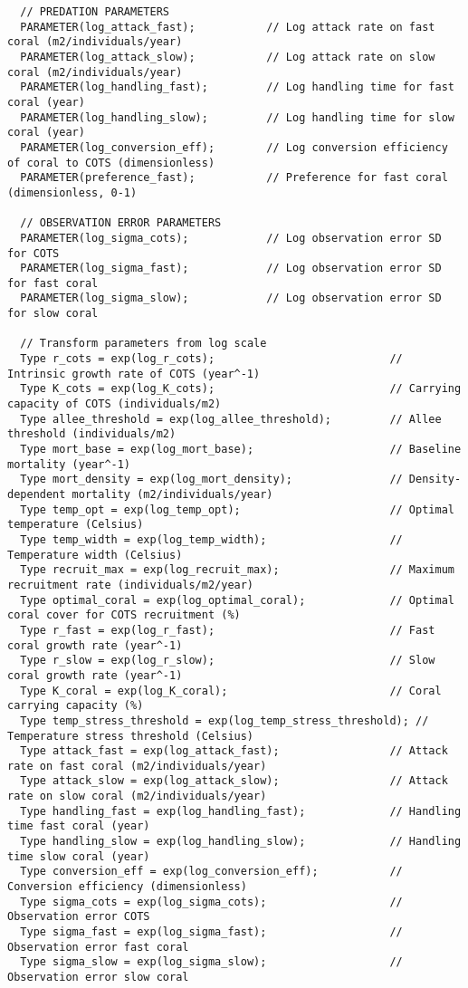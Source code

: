 \begin{lstlisting}
  // PREDATION PARAMETERS
  PARAMETER(log_attack_fast);           // Log attack rate on fast coral (m2/individuals/year)
  PARAMETER(log_attack_slow);           // Log attack rate on slow coral (m2/individuals/year)
  PARAMETER(log_handling_fast);         // Log handling time for fast coral (year)
  PARAMETER(log_handling_slow);         // Log handling time for slow coral (year)
  PARAMETER(log_conversion_eff);        // Log conversion efficiency of coral to COTS (dimensionless)
  PARAMETER(preference_fast);           // Preference for fast coral (dimensionless, 0-1)
  
  // OBSERVATION ERROR PARAMETERS
  PARAMETER(log_sigma_cots);            // Log observation error SD for COTS
  PARAMETER(log_sigma_fast);            // Log observation error SD for fast coral
  PARAMETER(log_sigma_slow);            // Log observation error SD for slow coral
  
  // Transform parameters from log scale
  Type r_cots = exp(log_r_cots);                           // Intrinsic growth rate of COTS (year^-1)
  Type K_cots = exp(log_K_cots);                           // Carrying capacity of COTS (individuals/m2)
  Type allee_threshold = exp(log_allee_threshold);         // Allee threshold (individuals/m2)
  Type mort_base = exp(log_mort_base);                     // Baseline mortality (year^-1)
  Type mort_density = exp(log_mort_density);               // Density-dependent mortality (m2/individuals/year)
  Type temp_opt = exp(log_temp_opt);                       // Optimal temperature (Celsius)
  Type temp_width = exp(log_temp_width);                   // Temperature width (Celsius)
  Type recruit_max = exp(log_recruit_max);                 // Maximum recruitment rate (individuals/m2/year)
  Type optimal_coral = exp(log_optimal_coral);             // Optimal coral cover for COTS recruitment (%)
  Type r_fast = exp(log_r_fast);                           // Fast coral growth rate (year^-1)
  Type r_slow = exp(log_r_slow);                           // Slow coral growth rate (year^-1)
  Type K_coral = exp(log_K_coral);                         // Coral carrying capacity (%)
  Type temp_stress_threshold = exp(log_temp_stress_threshold); // Temperature stress threshold (Celsius)
  Type attack_fast = exp(log_attack_fast);                 // Attack rate on fast coral (m2/individuals/year)
  Type attack_slow = exp(log_attack_slow);                 // Attack rate on slow coral (m2/individuals/year)
  Type handling_fast = exp(log_handling_fast);             // Handling time fast coral (year)
  Type handling_slow = exp(log_handling_slow);             // Handling time slow coral (year)
  Type conversion_eff = exp(log_conversion_eff);           // Conversion efficiency (dimensionless)
  Type sigma_cots = exp(log_sigma_cots);                   // Observation error COTS
  Type sigma_fast = exp(log_sigma_fast);                   // Observation error fast coral
  Type sigma_slow = exp(log_sigma_slow);                   // Observation error slow coral
  

\end{lstlisting}
